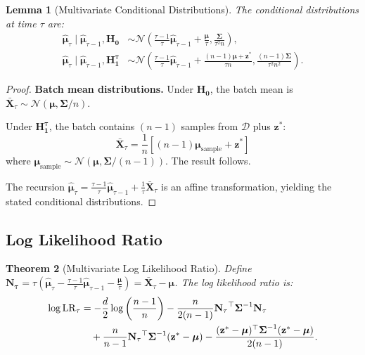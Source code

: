 \documentclass{article}
\theoremstyle{plain}
\newtheorem{theorem}{Theorem}[section]
\newtheorem{lemma}[theorem]{Lemma}
\theoremstyle{definition}
\theoremstyle{remark}
\newcommand{\bs}{\boldsymbol}
\newcommand{\cN}{\ensuremath{\mathcal{N}}}
\newcommand{\cD}{\ensuremath{\mathcal{D}}}
\begin{document}
\begin{lemma}[Multivariate Conditional Distributions]
    \label{lem:multivariate-conditional}
    The conditional distributions at time $\tau$ are:
    \begin{align*}
        \hat{\bs\mu}_\tau \mid \hat{\bs\mu}_{\tau-1}, \mathbf{H_0} & \sim \cN\left(\frac{\tau-1}{\tau}\hat{\bs\mu}_{\tau-1} + \frac{\bs\mu}{\tau}, \frac{\bs\Sigma}{\tau^2 n}\right),                              \\
        \hat{\bs\mu}_\tau \mid \hat{\bs\mu}_{\tau-1}, \mathbf{H_1^\tau} & \sim \cN\left(\frac{\tau-1}{\tau}\hat{\bs\mu}_{\tau-1} + \frac{(n-1)\bs\mu + \mathbf{z}^*}{\tau n}, \frac{(n-1)\bs\Sigma}{\tau^2 n^2}\right).
    \end{align*}
\end{lemma}

\begin{proof}
    \textbf{Batch mean distributions.}
    Under $\mathbf{H_0}$, the batch mean is $\bar{\mathbf{X}}_\tau \sim \cN(\bs\mu, \bs\Sigma/n)$.

    Under $\mathbf{H_1^\tau}$, the batch contains $(n-1)$ samples from $\cD$ plus $\mathbf{z}^*$:
    \begin{equation*}
        \bar{\mathbf{X}}_\tau = \frac{1}{n}\left[(n-1)\bs\mu_{\text{sample}} + \mathbf{z}^*\right]
    \end{equation*}
    where $\bs\mu_{\text{sample}} \sim \cN(\bs\mu, \bs\Sigma/(n-1))$. The result follows.

    The recursion $\hat{\bs\mu}_\tau = \frac{\tau-1}{\tau}\hat{\bs\mu}_{\tau-1} + \frac{1}{\tau}\bar{\mathbf{X}}_\tau$ is an affine transformation, yielding the stated conditional distributions.
\end{proof}

\subsection{Log Likelihood Ratio}

\begin{theorem}[Multivariate Log Likelihood Ratio]
    \label{thm:multivariate-log-lr-app}
    Define $\mathbf{N_\tau} = \tau(\hat{\bs\mu}_\tau - \frac{\tau-1}{\tau}\hat{\bs\mu}_{\tau-1} - \frac{\bs\mu}{\tau}) = \bar{\mathbf{X}}_\tau - \bs\mu$. The log likelihood ratio is:
    \begin{align*}
        \log \mathrm{LR}_\tau & = -\frac{d}{2}\log\left(\frac{n-1}{n}\right) - \frac{n}{2(n-1)}\mathbf{N_\tau}^\top \bs\Sigma^{-1} \mathbf{N_\tau} \notag                                               \\
                              & \quad + \frac{n}{n-1}\mathbf{N_\tau}^\top \bs\Sigma^{-1}(\mathbf{z}^* - \bs\mu) - \frac{(\mathbf{z}^* - \bs\mu)^\top \bs\Sigma^{-1}(\mathbf{z}^* - \bs\mu)}{2(n-1)}.
    \end{align*}
\end{theorem}
\end{document}
